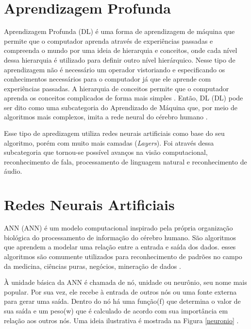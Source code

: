 \section{Aprendizagem Profunda}
\label{deep learning}

Aprendizagem Profunda (DL) é uma forma de aprendizagem de máquina que permite que o computador aprenda através de experiências passadas e compreenda o mundo por uma ideia de hierarquia e conceitos, onde cada nível dessa hierarquia é utilizado para definir outro nível hierárquico. Nesse tipo de aprendizagem não é necessário um operador vistoriando e especificando os conhecimentos necessários para o computador já que ele aprende com experiências passadas. A hierarquia de conceitos permite que o computador aprenda os conceitos complicados de forma mais simples \cite{goodfellow2016deep}. Então, \acrlong{DL} (DL) pode ser dito como uma subcategoria do Aprendizado de Máquina que, por meio de algoritmos mais complexos, imita a rede neural do cérebro humano \cite{diferencamachinelearning}.

Esse tipo de apredizagem utiliza redes neurais artificiais como base do seu algoritmo, porém com muito mais camadas (\textit{Layers}). Foi através dessa subcategoria que tornou-se possível avanços na visão computacional, reconhecimento de fala, processamento de linguagem natural e reconhecimento de áudio.

\section{Redes Neurais Artificiais}
\label{redes neurais}

\acrlong{ANN} (ANN) é um modelo computacional inspirado pela própria organização biológica do processamento de informação do cérebro humano. São algoritmos que aprendem a modelar uma relação entre a entrada e saída dos dados. esses algoritmos são comumente utilizados para reconhecimento de padrões no campo da medicina, ciências puras, negócios, mineração de dados \cite{redeneuralnvidia}.

À unidade básica da ANN é chamada de nó, unidade ou neurônio, seu nome mais popular. Por sua vez, ele recebe à entrada de outros nós ou uma fonte externa para gerar uma saída. Dentro do nó há uma função(f) que determina o valor de sua saída e um peso(w) que é calculado de acordo com sua importância em relação aos outros nós. Uma ideia ilustrativa é mostrada na Figura \ref{neuronio} \cite{conv2,redeneuralnvidia}.

